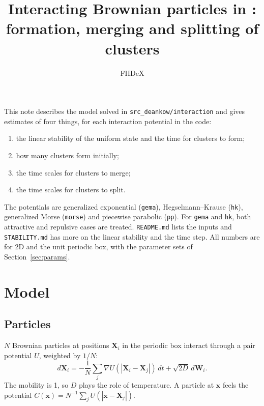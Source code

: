 \documentclass[11pt]{article}
\title{Interacting Brownian particles in \code{src\_deankow/interaction}:\\
formation, merging and splitting of clusters}
\author{FHDeX}
\date{}
\newcommand{\code}[1]{\texttt{#1}}
\begin{document}
\maketitle

\noindent This note describes the model solved in
\code{src\_deankow/interaction} and gives estimates of four things, for each
interaction potential in the code:
\begin{enumerate}[nosep]
  \item the linear stability of the uniform state and the time for clusters
        to form;
  \item how many clusters form initially;
  \item the time scales for clusters to merge;
  \item the time scales for clusters to split.
\end{enumerate}
The potentials are generalized exponential (\code{gema}), Hegselmann--Krause
(\code{hk}), generalized Morse (\code{morse}) and piecewise parabolic
(\code{pp}). For \code{gema} and \code{hk}, both attractive and repulsive
cases are treated. \code{README.md} lists the inputs and \code{STABILITY.md}
has more on the linear stability and the time step. All numbers are for 2D and
the unit periodic box, with the parameter sets of Section~\ref{sec:params}.

\section{Model}

\subsection{Particles}
$N$ Brownian particles at positions $\mathbf{X}_i$ in the periodic box
interact through a pair potential $U$, weighted by $1/N$:
\begin{equation}
  d\mathbf{X}_i = -\frac1N\sum_j\nabla U(|\mathbf{X}_i-\mathbf{X}_j|)\,dt
     + \sqrt{2D}\,d\mathbf{W}_i .
\end{equation}
The mobility is 1, so $D$ plays the role of temperature. A particle at
$\mathbf{x}$ feels the potential
$C(\mathbf{x}) = N^{-1}\sum_j U(|\mathbf{x}-\mathbf{X}_j|)$.
\end{document}
